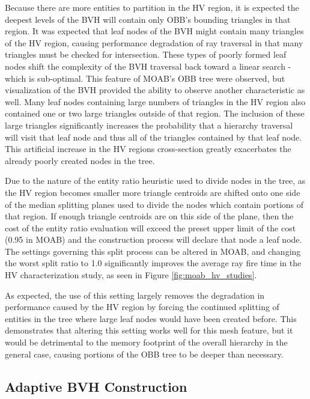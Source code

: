 Because there are more entities to partition in the HV region, it is expected
the deepest levels of the BVH will contain only OBB's bounding triangles in that
region. It was expected that leaf nodes of the BVH might contain many triangles
of the HV region, causing performance degradation of ray traversal in that many
triangles must be checked for intersection. These types of poorly formed leaf
nodes shift the complexity of the BVH traversal back toward a linear search -
which is sub-optimal. This feature of MOAB's OBB tree were observed, but
visualization of the BVH provided the ability to observe another characteristic
as well. Many leaf nodes containing large numbers of triangles in the HV region
also contained one or two large triangles outside of that region. The inclusion
of these large triangles significantly increases the probability that a
hierarchy traversal will visit that leaf node and thus all of the triangles
contained by that leaf node. This artificial increase in the HV regions
cross-section greatly exacerbates the already poorly created nodes in the tree.

Due to the nature of the entity ratio heuristic used to divide nodes in the
tree, as the HV region becomes smaller more triangle centroids are
shifted onto one side of the median splitting planes used to divide the nodes
which contain portions of that region. If enough triangle centroids are on this
side of the plane, then the cost of the entity ratio evaluation will exceed the
preset upper limit of the cost (0.95 in MOAB) and the construction process will
declare that node a leaf node. The settings governing this split process can be
altered in MOAB, and changing the worst split ratio to 1.0 significantly
improves the average ray fire time in the HV characterization study,
as seen in Figure \ref{fig:moab_hv_studies}.

As expected, the use of this setting largely removes the degradation in performance
caused by the HV region by forcing the continued splitting of entities
in the tree where large leaf nodes would have been created before. This
demonstrates that altering this setting works well for this mesh feature, but it
would be detrimental to the memory footprint of the overall hierarchy in the
general case, causing portions of the OBB tree to be deeper than necessary. 


\subsection{Adaptive BVH Construction}\label{subsec:adaptive_construction}

